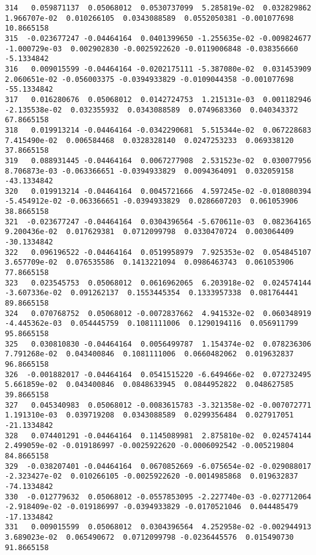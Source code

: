 \documentclass[15pt,a4paper,openright]{article}
\begin{document}
\begin{lstlisting}[language=AMPL, caption = data file]
314   0.059871137  0.05068012  0.0530737099  5.285819e-02  0.032829862  1.966707e-02  0.010266105  0.0343088589  0.0552050381 -0.001077698   10.8665158
315  -0.023677247 -0.04464164  0.0401399650 -1.255635e-02 -0.009824677 -1.000729e-03  0.002902830 -0.0025922620 -0.0119006848 -0.038356660   -5.1334842
316   0.009015599 -0.04464164 -0.0202175111 -5.387080e-02  0.031453909  2.060651e-02 -0.056003375 -0.0394933829 -0.0109044358 -0.001077698  -55.1334842
317   0.016280676  0.05068012  0.0142724753  1.215131e-03  0.001182946 -2.135538e-02  0.032355932  0.0343088589  0.0749683360  0.040343372   67.8665158
318   0.019913214 -0.04464164 -0.0342290681  5.515344e-02  0.067228683  7.415490e-02  0.006584468  0.0328328140  0.0247253233  0.069338120   37.8665158
319   0.088931445 -0.04464164  0.0067277908  2.531523e-02  0.030077956  8.706873e-03 -0.063366651 -0.0394933829  0.0094364091  0.032059158  -43.1334842
320   0.019913214 -0.04464164  0.0045721666  4.597245e-02 -0.018080394 -5.454912e-02 -0.063366651 -0.0394933829  0.0286607203  0.061053906   38.8665158
321  -0.023677247 -0.04464164  0.0304396564 -5.670611e-03  0.082364165  9.200436e-02  0.017629381  0.0712099798  0.0330470724  0.003064409  -30.1334842
322   0.096196522 -0.04464164  0.0519958979  7.925353e-02  0.054845107  3.657709e-02  0.076535586  0.1413221094  0.0986463743  0.061053906   77.8665158
323   0.023545753  0.05068012  0.0616962065  6.203918e-02  0.024574144 -3.607336e-02  0.091262137  0.1553445354  0.1333957338  0.081764441   89.8665158
324   0.070768752  0.05068012 -0.0072837662  4.941532e-02  0.060348919 -4.445362e-03  0.054445759  0.1081111006  0.1290194116  0.056911799   95.8665158
325   0.030810830 -0.04464164  0.0056499787  1.154374e-02  0.078236306  7.791268e-02  0.043400846  0.1081111006  0.0660482062  0.019632837   96.8665158
326  -0.001882017 -0.04464164  0.0541515220 -6.649466e-02  0.072732495  5.661859e-02  0.043400846  0.0848633945  0.0844952822  0.048627585   39.8665158
327   0.045340983  0.05068012 -0.0083615783 -3.321358e-02 -0.007072771  1.191310e-03  0.039719208  0.0343088589  0.0299356484  0.027917051  -21.1334842
328   0.074401291 -0.04464164  0.1145089981  2.875810e-02  0.024574144  2.499059e-02 -0.019186997 -0.0025922620 -0.0006092542 -0.005219804   84.8665158
329  -0.038207401 -0.04464164  0.0670852669 -6.075654e-02 -0.029088017 -2.323427e-02  0.010266105 -0.0025922620 -0.0014985868  0.019632837  -74.1334842
330  -0.012779632  0.05068012 -0.0557853095 -2.227740e-03 -0.027712064 -2.918409e-02 -0.019186997 -0.0394933829 -0.0170521046  0.044485479  -17.1334842
331   0.009015599  0.05068012  0.0304396564  4.252958e-02 -0.002944913  3.689023e-02  0.065490672  0.0712099798 -0.0236445576  0.015490730   91.8665158

\end{lstlisting}
\end{document}
